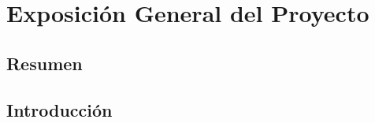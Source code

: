 \documentclass{proyectotesis}
\begin{document}
\newpage

\section{Exposición General del Proyecto}
\subsection{Resumen}

\subsection{Introducción}


\end{document}
